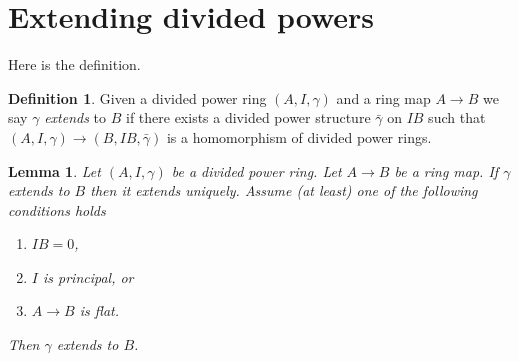 \documentclass{stacks-project}
\theoremstyle{plain}
\newtheorem{lemma}[subsection]{Lemma}
\theoremstyle{definition}
\newtheorem{definition}[subsection]{Definition}
\theoremstyle{remark}
\numberwithin{equation}{subsection}
\begin{document}
\section{Extending divided powers}
\label{section-extend}

\noindent
Here is the definition.

\begin{definition}
\label{definition-extends}
Given a divided power ring $(A, I, \gamma)$ and a ring map
$A \to B$ we say $\gamma$ {\it extends} to $B$ if there exists a
divided power structure $\bar \gamma$ on $IB$ such that
$(A, I, \gamma) \to (B, IB, \bar\gamma)$ is a homomorphism of
divided power rings.
\end{definition}

\begin{lemma}
\label{lemma-gamma-extends}
Let $(A, I, \gamma)$ be a divided power ring.
Let $A \to B$ be a ring map.
If $\gamma$ extends to $B$ then it extends uniquely.
Assume (at least) one of the following conditions holds
\begin{enumerate}
\item $IB = 0$,
\item $I$ is principal, or
\item $A \to B$ is flat.
\end{enumerate}
Then $\gamma$ extends to $B$.
\end{lemma}
\end{document}
